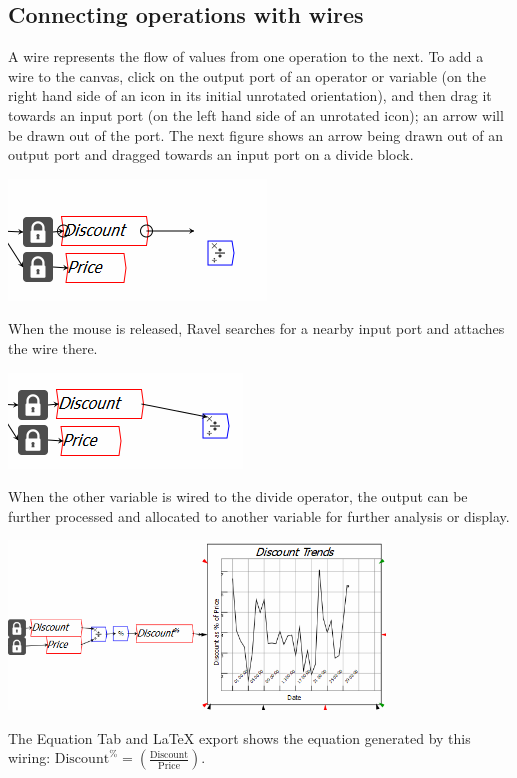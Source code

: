 \label{Wires}

\subsection{Connecting operations with wires}

A wire represents the flow of values from one operation to the next.
To add a wire to the canvas, click on the output port of an operator
or variable (on the right hand side of an icon in its initial unrotated
orientation), and then drag it towards an input port (on the left
hand side of an unrotated icon); an arrow will be drawn out of the
port. The next figure shows an arrow being drawn out of an output
port and dragged towards an input port on a divide block.

\includegraphics{images/ArrowDrawing01}

When the mouse is released, Ravel searches for a nearby input port
and attaches the wire there.

\includegraphics{images/ArrowDrawing02}

When the other variable is wired to the divide operator, the output
can be further processed and allocated to another variable for further
analysis or display.

\includegraphics[width=10cm]{images/ArrowDrawing03}

The Equation Tab and LaTeX export shows the equation generated by
this wiring: $\mathrm{Discount}^{\%}=\left(\frac{\mathrm{Discount}}{\mathrm{Price}}\right)$.

